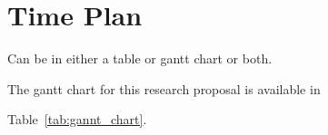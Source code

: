 \section{Time Plan} \label{timePlan}
\begin{theo}{}
Can be in either a table or gantt chart or both.
\end{theo}

The gantt chart for this research proposal is available in

Table~\ref{tab:gannt_chart}.



